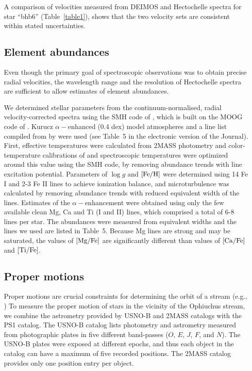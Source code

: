 \documentclass[iop]{emulateapj}
\begin{document}
A comparison of velocities measured from DEIMOS and Hectochelle spectra for star
``bhb6'' (Table~\ref{table1}), shows that the two velocity sets are consistent
within stated uncertainties.

\subsection{Element abundances}

Even though the primary goal of spectroscopic observations was to obtain precise
radial velocities, the wavelength range and the resolution of Hectochelle
spectra are sufficient to allow estimates of element abundances.

We determined stellar parameters from the continuum-normalised, radial
velocity-corrected spectra using the SMH code of \citet{cas14}, which is built
on the MOOG code of \citet{sne73}. Kurucz $\alpha-$enhanced (0.4 dex) model
atmospheres \citep{ck04} and a line list compiled from \citet{fre10} by
\citet{cas14} were used (see Table~5 in the electronic version of the Journal).
First, effective temperatures were calculated from 2MASS photometry and
color-temperature calibrations of \citet{ghb09} and spectroscopic temperatures
were optimized around this value using the SMH code, by removing abundance
trends with line excitation potential. Parameters of $\log g$ and ${\rm [Fe/H]}$
were determined using 14 Fe I and 2-3 Fe II lines to achieve ionization balance,
and microturbulence was calculated by removing abundance trends with reduced
equivalent width of the lines. Estimates of the $\alpha-$enhancement were
obtained using only the few available clean Mg, Ca and Ti (I and II) lines,
which comprised a total of 6-8 lines per star. The abundances were measured from
equivalent widths and the lines we used are listed in Table~5. Because Mg lines
are strong and may be saturated, the values of ${\rm [Mg/Fe]}$ are significantly
different than values of ${\rm [Ca/Fe]}$ and ${\rm [Ti/Fe]}$.

\subsection{Proper motions}

Proper motions are crucial constraints for determining the orbit of a stream
(e.g., \citealt{kop10}) To measure the proper motion of stars in the vicinity of
the Ophiuchus stream, we combine the astrometry provided by USNO-B \citep{mon03}
and 2MASS \citep{skr06} catalogs with the PS1 catalog. The USNO-B catalog lists
photometry and astrometry measured from photographic plates in five different
band-passes ($O$, $E$, $J$, $F$, and $N$). The USNO-B plates were exposed at
different epochs, and thus each object in the catalog can have a maximum of five
recorded positions. The 2MASS catalog provides only one position entry per
object.
\end{document}

